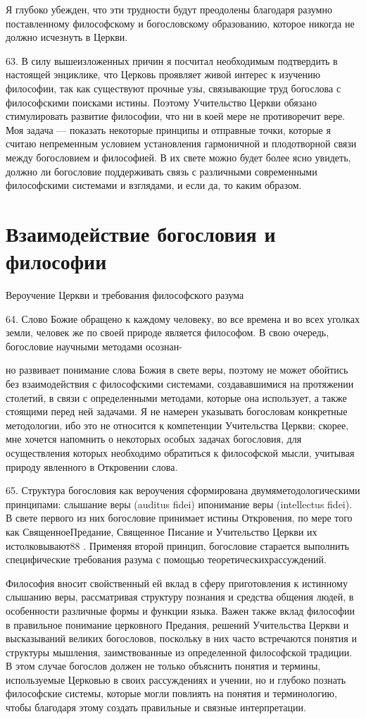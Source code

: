 \documentclass[a5paper,10pt]{article}
\begin{document}
Я глубоко убежден, что эти трудности будут преодолены благодаря разумно
поставленному философскому и богословскому образованию, которое никогда не
должно исчезнуть в Церкви.

63. В силу вышеизложенных причин я посчитал необходимым подтвердить в настоящей
энциклике, что Церковь проявляет живой интерес к изучению философии, так как
существуют прочные узы, связывающие труд богослова с философскими поисками
истины. Поэтому Учительство Церкви обязано стимулировать развитие философии,
что ни в коей мере не противоречит вере. Моя задача — показать некоторые
принципы и отправные точки, которые я считаю непременным условием установления
гармоничной и плодотворной связи между богословием и философией. В их свете
можно будет более ясно увидеть, должно ли богословие поддерживать связь с
различными современными философскими системами и взглядами, и если да, то каким
образом.

\section{Взаимодействие богословия и философии}

Вероучение Церкви и требования философского разума

64. Слово Божие обращено к каждому человеку, во все времена и во всех уголках
земли, человек же по своей природе является философом. В свою очередь,
богословие научными методами осознан-

но развивает понимание слова Божия в свете веры, поэтому не может обойтись без
взаимодействия с философскими системами, создававшимися на протяжении столетий,
в связи с определенными методами, которые она использует, а также стоящими
перед ней задачами. Я не намерен указывать богословам конкретные методологии,
ибо это не относится к компетенции Учительства Церкви; скорее, мне хочется
напомнить о некоторых особых задачах богословия, для осуществления которых
необходимо обратиться к философской мысли, учитывая природу явленного в
Откровении слова.

65. Структура богословия как вероучения сформирована двумяметодологическими
принципами: слышание веры (auditus fidei) ипонимание веры (intellectus fidei).
В свете первого из них богословие принимает истины Откровения, по мере того как
СвященноеПредание, Священное Писание и Учительство Церкви их истолковывают88 .
Применяя второй принцип, богословие старается выполнить специфические
требования разума с помощью теоретическихрассуждений.

Философия вносит свойственный ей вклад в сферу приготовления к истинному
слышанию веры, рассматривая структуру познания и средства общения людей, в
особенности различные формы и функции языка. Важен также вклад философии в
правильное понимание церковного Предания, решений Учительства Церкви и
высказываний великих богословов, поскольку в них часто встречаются понятия и
структуры мышления, заимствованные из определенной философской традиции. В этом
случае богослов должен не только объяснить понятия и термины, используемые
Церковью в своих рассуждениях и учении, но и глубоко познать философские
системы, которые могли повлиять на понятия и терминологию, чтобы благодаря
этому создать правильные и связные интерпретации.
\end{document}
